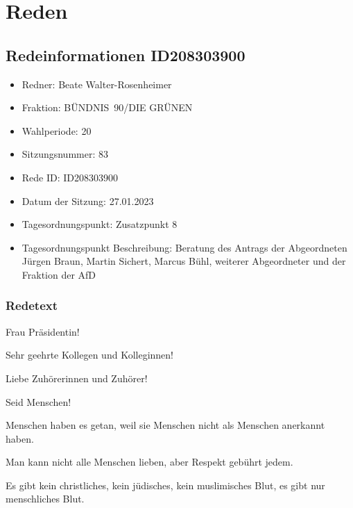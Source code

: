 \documentclass{article}
\begin{document}
\tableofcontents
\newpage\section{Reden}\subsection{Redeinformationen ID208303900}
\begin{itemize}
\item Redner: Beate Walter-Rosenheimer
\item Fraktion: BÜNDNIS 90/DIE GRÜNEN
\item Wahlperiode: 20
\item Sitzungsnummer: 83
\item Rede ID: ID208303900
\item Datum der Sitzung: 27.01.2023
\item Tagesordnungspunkt: Zusatzpunkt 8
\item Tagesordnungspunkt Beschreibung: Beratung des Antrags der Abgeordneten Jürgen Braun, Martin Sichert, Marcus Bühl, weiterer Abgeordneter und der Fraktion der AfD

\end{itemize}
\subsubsection{Redetext}
\colorbox{CustomColor0}{\parbox{\linewidth}{Frau Präsidentin!}}

\colorbox{CustomColor0}{\parbox{\linewidth}{Sehr geehrte Kollegen und Kolleginnen!}}

\colorbox{CustomColor1}{\parbox{\linewidth}{Liebe Zuhörerinnen und Zuhörer!}}

\colorbox{CustomColor0}{\parbox{\linewidth}{Seid Menschen!}}

\colorbox{CustomColor2}{\parbox{\linewidth}{Menschen haben es getan, weil sie Menschen nicht als Menschen anerkannt haben.}}

\colorbox{CustomColor3}{\parbox{\linewidth}{Man kann nicht alle Menschen lieben, aber Respekt gebührt jedem.}}

\colorbox{CustomColor4}{\parbox{\linewidth}{Es gibt kein christliches, kein jüdisches, kein muslimisches Blut, es gibt nur menschliches Blut.}}
\end{document}
